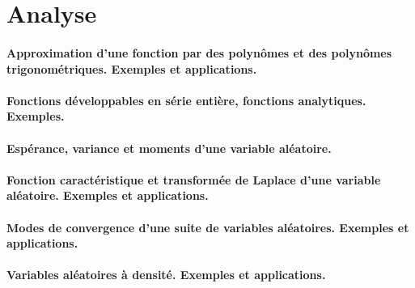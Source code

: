 \section{Analyse}

\paragraph{Approximation d’une fonction par des polynômes et des polynômes trigonométriques. Exemples et applications.}
\paragraph{Fonctions développables en série entière, fonctions analytiques. Exemples.}
\paragraph{Espérance, variance et moments d'une variable aléatoire.}
\paragraph{Fonction caractéristique et transformée de Laplace d'une variable aléatoire. Exemples et applications.}
\paragraph{Modes de convergence d’une suite de variables aléatoires. Exemples et applications.}
\paragraph{Variables aléatoires à densité. Exemples et applications.}
